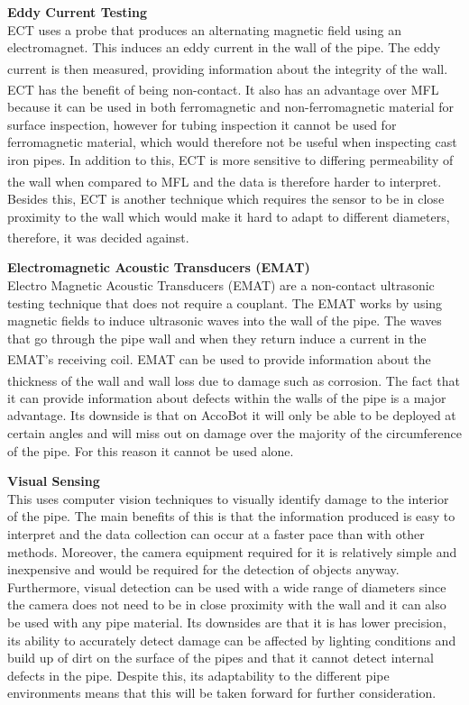 \documentclass[11pt]{article}		%
\newcommand{\supercite}[1]{\textsuperscript{\cite{#1}}}		%
\begin{document}
	        \textbf{Eddy Current Testing}
	        \\
	        ECT uses a probe that produces an alternating magnetic field using an electromagnet. This induces an eddy current in the wall of the pipe. The eddy current is then measured, providing information about the integrity of the wall.\supercite{ECT} ECT has the benefit of being non-contact.\supercite{Corrosion} It also has an advantage over MFL because it can be used in both ferromagnetic and non-ferromagnetic material for surface inspection, however for tubing inspection it cannot be used for ferromagnetic material, which would therefore not be useful when inspecting cast iron pipes. In addition to this, ECT is more sensitive to differing permeability of the wall when compared to MFL and the data is therefore harder to interpret.\supercite{MFL_explanation} Besides this, ECT is another technique which requires the sensor to be in close proximity to the wall which would make it hard to adapt to different diameters, therefore, it was decided against.\supercite{ECT}
	        
	        \textbf{Electromagnetic Acoustic Transducers (EMAT)}
	        \\
	        Electro Magnetic Acoustic Transducers (EMAT) are a non-contact ultrasonic testing technique that does not require a couplant. The EMAT works by using magnetic fields to induce ultrasonic waves into the wall of the pipe. The waves that go through the pipe wall and when they return induce a current in the EMAT’s receiving coil.\supercite{EMAT} EMAT can be used to provide information about the thickness of the wall and wall loss due to damage such as corrosion.\supercite{EMAT} The fact that it can provide information about defects within the walls of the pipe is a major advantage. Its downside is that on AccoBot it will only be able to be deployed at certain angles and will miss out on damage over the majority of the circumference of the pipe. For this reason it cannot be used alone.
			
			\textbf{Visual Sensing}
			\\
	        This uses computer vision techniques to visually identify damage to the interior of the pipe. The main benefits of this is that the information produced is easy to interpret and the data collection can occur at a faster pace than with other methods. Moreover, the camera equipment required for it is relatively simple and inexpensive and would be required for the detection of objects anyway. Furthermore, visual detection can be used with a wide range of diameters since the camera does not need to be in close proximity with the wall and it can also be used with any pipe material. Its downsides are that it is has lower precision, its ability to accurately detect damage can be affected by lighting conditions and build up of dirt on the surface of the pipes and that it cannot detect internal defects in the pipe. Despite this, its adaptability to the different pipe environments means that this will be taken forward for further consideration. 
	        
\end{document}
